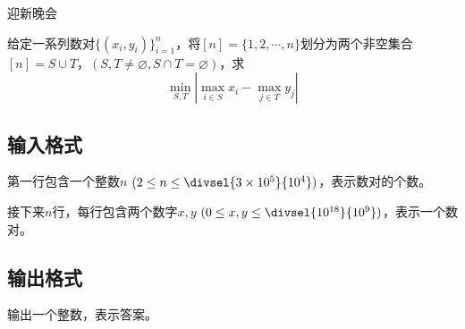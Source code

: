 \begin{Problem}{迎新晚会}{}

给定一系列数对$\{(x_i, y_i)\}_{i=1}^{n}$，将$[n] = \{1, 2, \cdots, n\}$划分为两个非空集合$[n] = S \cup T$，$(S, T \neq \varnothing, S \cap T = \varnothing)$，求
$$
\min_{S, T} | \max_{i \in S} x_i - \max_{j \in T} y_j |
$$

\subsection*{输入格式}

第一行包含一个整数$n$ $(2 \leq n \leq \divsel{3 \times 10^5}{10^4})$，表示数对的个数。

接下来$n$行，每行包含两个数字$x, y$ $(0 \leq x, y \leq \divsel{10^{18}}{10^9})$，表示一个数对。

\subsection*{输出格式}

输出一个整数，表示答案。


\end{Problem}
